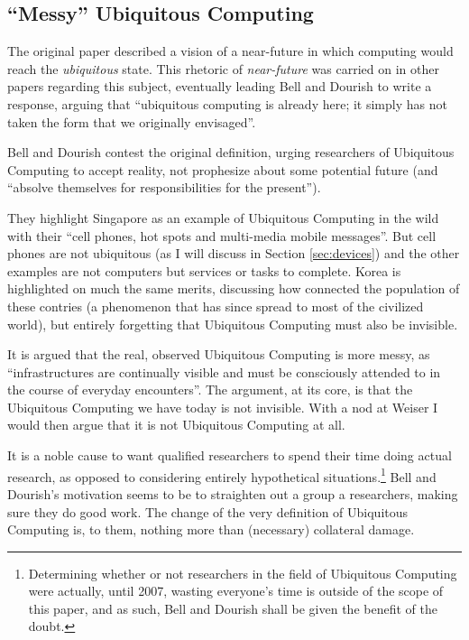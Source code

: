 \subsection*{``Messy'' Ubiquitous Computing}

The original paper described a vision of a near-future in which computing would reach the \emph{ubiquitous} state.
This rhetoric of \emph{near-future} was carried on in other papers regarding this subject, eventually leading Bell
and Dourish to write a response, arguing that ``ubiquitous computing is already here; it simply has not taken the
form that we originally envisaged''.\cite{bell07}

Bell and Dourish contest the original definition, urging researchers of Ubiquitous Computing to accept reality, not
prophesize about some potential future (and ``absolve themselves for responsibilities for the present''\cite{bell07}).

They highlight Singapore as an example of Ubiquitous Computing in the wild with their ``cell phones, hot spots and
multi-media mobile messages''. But cell phones are not ubiquitous (as I will discuss in Section \ref{sec:devices}) and
the other examples are not computers but services or tasks to complete. Korea is highlighted on much the same merits,
discussing how connected the population of these contries (a phenomenon that has since spread to most of the civilized
world), but entirely forgetting that Ubiquitous Computing must also be invisible.

It is argued that the real, observed Ubiquitous Computing is more messy, as ``infrastructures are continually visible and
must be consciously attended to in the course of everyday encounters''.\cite{bell07} The argument, at its core, is that
the Ubiquitous Computing we have today is not invisible. With a nod at Weiser I would then argue that it is not Ubiquitous
Computing at all.

It is a noble cause to want qualified researchers to spend their time doing actual research, as opposed to
considering entirely hypothetical situations.\footnote{Determining whether or not researchers in the field of
Ubiquitous Computing were actually, until 2007, wasting everyone's time is outside of the scope of this paper,
and as such, Bell and Dourish shall be given the benefit of the doubt.} Bell and Dourish's motivation seems to
be to straighten out a group a researchers, making sure they do good work. The change of the very definition of
Ubiquitous Computing is, to them, nothing more than (necessary) collateral damage.

